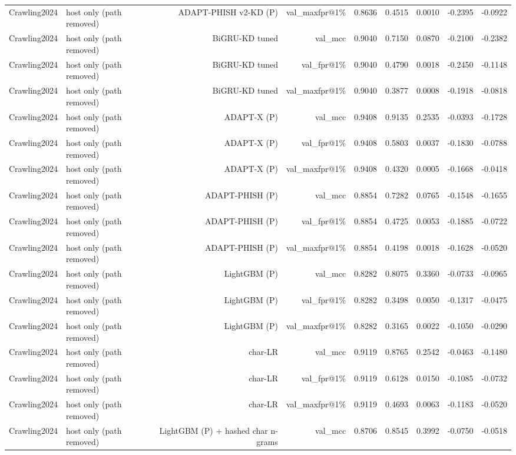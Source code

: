 \begin{table}[t]
\begin{tabular}{llrrrrrrr}
Crawling2024 & host only (path removed) & ADAPT-PHISH v2-KD (P) & val\_maxfpr@1\% & 0.8636 & 0.4515 & 0.0010 & -0.2395 & -0.0922 \\
Crawling2024 & host only (path removed) & BiGRU-KD tuned & val\_mcc & 0.9040 & 0.7150 & 0.0870 & -0.2100 & -0.2382 \\
Crawling2024 & host only (path removed) & BiGRU-KD tuned & val\_fpr@1\% & 0.9040 & 0.4790 & 0.0018 & -0.2450 & -0.1148 \\
Crawling2024 & host only (path removed) & BiGRU-KD tuned & val\_maxfpr@1\% & 0.9040 & 0.3877 & 0.0008 & -0.1918 & -0.0818 \\
Crawling2024 & host only (path removed) & ADAPT-X (P) & val\_mcc & 0.9408 & 0.9135 & 0.2535 & -0.0393 & -0.1728 \\
Crawling2024 & host only (path removed) & ADAPT-X (P) & val\_fpr@1\% & 0.9408 & 0.5803 & 0.0037 & -0.1830 & -0.0788 \\
Crawling2024 & host only (path removed) & ADAPT-X (P) & val\_maxfpr@1\% & 0.9408 & 0.4320 & 0.0005 & -0.1668 & -0.0418 \\
Crawling2024 & host only (path removed) & ADAPT-PHISH (P) & val\_mcc & 0.8854 & 0.7282 & 0.0765 & -0.1548 & -0.1655 \\
Crawling2024 & host only (path removed) & ADAPT-PHISH (P) & val\_fpr@1\% & 0.8854 & 0.4725 & 0.0053 & -0.1885 & -0.0722 \\
Crawling2024 & host only (path removed) & ADAPT-PHISH (P) & val\_maxfpr@1\% & 0.8854 & 0.4198 & 0.0018 & -0.1628 & -0.0520 \\
Crawling2024 & host only (path removed) & LightGBM (P) & val\_mcc & 0.8282 & 0.8075 & 0.3360 & -0.0733 & -0.0965 \\
Crawling2024 & host only (path removed) & LightGBM (P) & val\_fpr@1\% & 0.8282 & 0.3498 & 0.0050 & -0.1317 & -0.0475 \\
Crawling2024 & host only (path removed) & LightGBM (P) & val\_maxfpr@1\% & 0.8282 & 0.3165 & 0.0022 & -0.1050 & -0.0290 \\
Crawling2024 & host only (path removed) & char-LR & val\_mcc & 0.9119 & 0.8765 & 0.2542 & -0.0463 & -0.1480 \\
Crawling2024 & host only (path removed) & char-LR & val\_fpr@1\% & 0.9119 & 0.6128 & 0.0150 & -0.1085 & -0.0732 \\
Crawling2024 & host only (path removed) & char-LR & val\_maxfpr@1\% & 0.9119 & 0.4693 & 0.0063 & -0.1183 & -0.0520 \\
Crawling2024 & host only (path removed) & LightGBM (P) + hashed char n-grams & val\_mcc & 0.8706 & 0.8545 & 0.3992 & -0.0750 & -0.0518 \\

\end{tabular}
\end{table}
